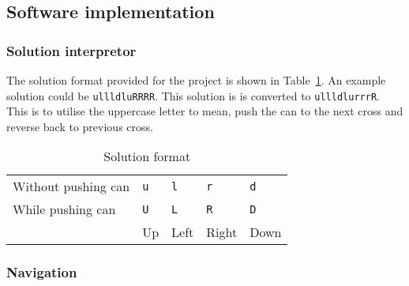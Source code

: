 \documentclass[../../main.tex]{subfiles}
\begin{document}
\subsection{Software implementation}%
\label{sub:software_implementation}

\subsubsection{Solution interpretor}%
\label{ssub:solution_intepretor}

The solution format provided for the project is shown in Table~\ref{tab:solution_format}.
An example solution could be \texttt{ullldluRRRR}.
This solution is is converted to \texttt{ullldlurrrR}. This is to utilise the uppercase letter to
mean, push the can to the next cross and reverse back to previous cross.

\begin{table}[h]
	\centering
	\caption{Solution format}
	\label{tab:solution_format}
	\begin{tabular}{*{5}{l}}
		\toprule
		Without pushing can & \tt u &\tt  l & \tt r & \tt d \\
		While pushing can & \tt U & \tt L & \tt R & \tt D \\
		\cmidrule{2-5}
											& Up & Left & Right & Down\\
											\bottomrule
	\end{tabular}
\end{table}

\subsubsection{Navigation}%
\label{ssub:navigation}





	
\end{document}
